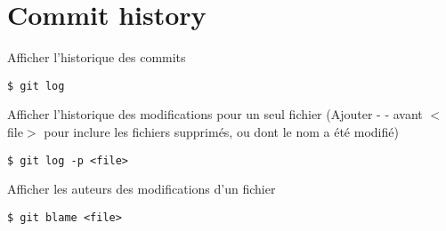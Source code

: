 \section*{Commit history}

Afficher l'historique des commits
\begin{lstlisting}
$ git log
\end{lstlisting}
Afficher l'historique des modifications pour un seul fichier (Ajouter - - avant $<$file$>$ pour inclure les fichiers supprimés, ou dont le nom a été modifié)
\begin{lstlisting}
$ git log -p <file>
\end{lstlisting}
Afficher les auteurs des modifications d'un fichier
\begin{lstlisting}
$ git blame <file>
\end{lstlisting}